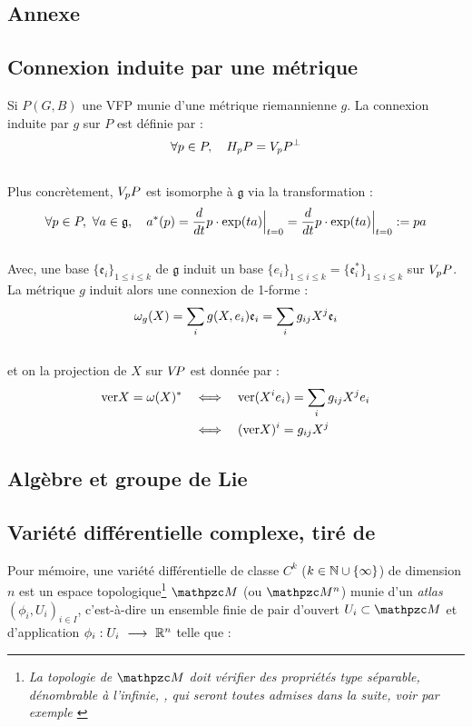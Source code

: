 


\begin{annexe}

\section{Annexe}

\subsection{Connexion induite par une métrique}

Si $P(G,B)$ une VFP munie d'une métrique riemannienne $g$. La connexion induite par $g$ sur $P$ est définie par :
\begin{equation}
	\forall p\in P,\quad \hg[p]{P} = \vg[p]{P}^\perp
\end{equation}
\\
Plus concrètement, $\vg[p]{P}$ est isomorphe à $\mathfrak{g}$ via la transformation :
\[\forall p\in P,\ \forall a\in\mathfrak{g},\quad a^*(p) = \frac{d}{dt} p\cdot \exp(t a)\Big|_{t=0} = \frac{d}{dt} p\cdot \exp(t a)\Big|_{t=0}\defeq pa\]
\\
Avec, une base $\{\mathfrak{e}_i\}_{1\leq i\leq k}$ de $\mathfrak{g}$ induit un base $\{e_i\}_{1\leq i\leq k} = \{\mathfrak{e}^*_i\}_{1\leq i\leq k}$ sur $\vg[p]{P}$. La métrique $g$ induit alors une connexion de 1-forme :
\[\conn_g(X) = \sum_i g(X, e_i) \mathfrak{e}_i = \sum_i g_{ij}X^j \mathfrak{e}_i\]
\\
et on la projection de $X$ sur $\vg{P}$ est donnée par :
\begin{align*}
	\ver X = \conn(X)^*\quad &\Llr\quad  \ver (X^ie_i) = \sum_i g_{ij}X^j e_i \\
	&\Llr\quad  (\ver X)^i = g_{ij}X^j
\end{align*}


\subsection{Algèbre et groupe de Lie} \label{ann:2Lie}




\subsection{Variété différentielle complexe, tiré de \cite{nakahara_geometry_2003}}\label{ann:VDC}

Pour mémoire, une variété différentielle de classe $C^k$ ($k\in\N\cup\{\infty\}$) de dimension $n$ est un espace topologique\footnote{\itshape
	La topologie de $\manu$ doit vérifier des propriétés type séparable, dénombrable à l'infinie, \etc, qui seront toutes admises dans la suite, voir par exemple \cite[chap. 2]{lafontaine_introduction_2015}}
$\manu$ (ou $\manu^n$) munie d'un \emph{atlas} $(\phi_i, U_i)_{i\in I}$, c'est-à-dire un ensemble finie de pair d'ouvert $U_i\subset \manu$ et d'application $\phi_i :U_i\ \lr\ \R^n$ telle que :
\begin{itemize}
	

\end{itemize}
\end{annexe}
